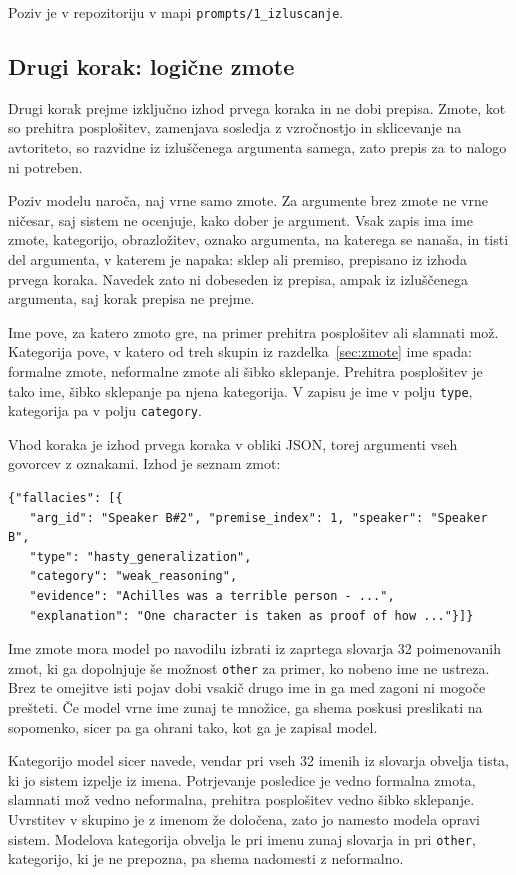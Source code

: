 \documentclass[a4paper, 12pt]{book}
\begin{document}
Poziv je v repozitoriju v mapi \texttt{prompts/1\_izluscanje}.

\subsection{Drugi korak: logične zmote}
\label{ssec:prehod2}

Drugi korak prejme izključno izhod prvega koraka in ne dobi prepisa. 
Zmote, kot so prehitra posplošitev, zamenjava sosledja z vzročnostjo in sklicevanje na avtoriteto, so razvidne iz izluščenega argumenta samega, zato prepis za to nalogo ni potreben.

Poziv modelu naroča, naj vrne samo zmote. Za argumente brez zmote ne vrne ničesar, saj sistem ne ocenjuje, kako dober je argument. Vsak zapis ima ime zmote, kategorijo, obrazložitev, oznako argumenta, na katerega se nanaša, in tisti del argumenta, v katerem je napaka: sklep ali premiso, prepisano iz izhoda prvega koraka. Navedek zato ni dobeseden iz prepisa, ampak iz izluščenega argumenta, saj korak prepisa ne prejme.

Ime pove, za katero zmoto gre, na primer prehitra posplošitev ali slamnati mož. Kategorija pove, v katero od treh skupin iz razdelka~\ref{sec:zmote} ime spada: formalne zmote, neformalne zmote ali šibko sklepanje. Prehitra posplošitev je tako ime, šibko sklepanje pa njena kategorija. V zapisu je ime v polju \texttt{type}, kategorija pa v polju \texttt{category}.

Vhod koraka je izhod prvega koraka v obliki JSON, torej argumenti vseh govorcev z oznakami. Izhod je seznam zmot:

\begin{lstlisting}[basicstyle=\ttfamily\scriptsize,breaklines=true]
{"fallacies": [{
   "arg_id": "Speaker B#2", "premise_index": 1, "speaker": "Speaker B",
   "type": "hasty_generalization",
   "category": "weak_reasoning",
   "evidence": "Achilles was a terrible person - ...",
   "explanation": "One character is taken as proof of how ..."}]}
\end{lstlisting}

Ime zmote mora model po navodilu izbrati iz zaprtega slovarja 32 poimenovanih zmot, ki ga dopolnjuje še možnost \texttt{other} za primer, ko nobeno ime ne ustreza. Brez te omejitve isti pojav dobi vsakič drugo ime in ga med zagoni ni mogoče prešteti. Če model vrne ime zunaj te množice, ga shema poskusi preslikati na sopomenko, sicer pa ga ohrani tako, kot ga je zapisal model.

Kategorijo model sicer navede, vendar pri vseh 32 imenih iz slovarja obvelja tista, ki jo sistem izpelje iz imena. Potrjevanje posledice je vedno formalna zmota, slamnati mož vedno neformalna, prehitra posplošitev vedno šibko sklepanje. Uvrstitev v skupino je z imenom že določena, zato jo namesto modela opravi sistem. Modelova kategorija obvelja le pri imenu zunaj slovarja in pri \texttt{other}, kategorijo, ki je ne prepozna, pa shema nadomesti z neformalno.
\end{document}
